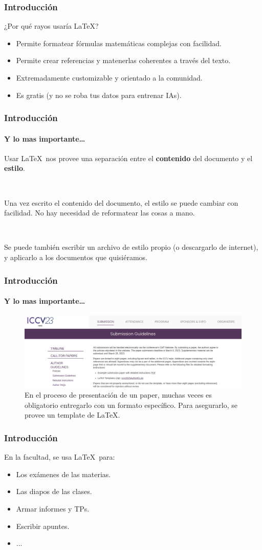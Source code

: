 \begin{frame}
    \frametitle{Introducción}
    \begin{tcolorbox}[colframe=color1]
        \begin{center}
            ¿Por qué rayos usaría \LaTeX ?
        \end{center}
    \end{tcolorbox}

    \begin{itemize}
        \item Permite formatear fórmulas matemáticas complejas con facilidad.
        \item Permite crear referencias y matenerlas coherentes a través del texto.
        \item Extremadamente customizable y orientado a la comunidad.
        \item Es gratis (y no se roba tus datos para entrenar IAs).
    \end{itemize}
\end{frame}

\begin{frame}
    \frametitle{Introducción}
    \framesubtitle{Y lo mas importante\dots}

    Usar \LaTeX\ nos provee una separación entre el \textbf{contenido} del documento y el \textbf{estilo}.
    
    \

    Una vez escrito el contenido del documento, el estilo se puede cambiar con facilidad. No hay necesidad de reformatear las cosas a mano.
    
    \

    Se puede también escribir un archivo de estilo propio (o descargarlo de internet), y aplicarlo a los documentos que quisiéramos.
    
\end{frame}

\begin{frame}
    \frametitle{Introducción}
    \framesubtitle{Y lo mas importante\dots}
    \begin{figure}[h]
        \centering
        \includegraphics[width=\textwidth]{../images/submission.png}
        \caption{En el proceso de presentación de un paper, muchas veces es obligatorio entregarlo con un formato específico. Para asegurarlo, se provee un template de \LaTeX.}
    \end{figure}
\end{frame}

\begin{frame}
\frametitle{Introducción}
    En la facultad, se usa \LaTeX\ para:
    \begin{itemize}
    \item Los exámenes de las materias.
    \item Las diapos de las clases.
    \item Armar informes y TPs.
    \item Escribir apuntes.
    \item ...
    \end{itemize}
\end{frame}
